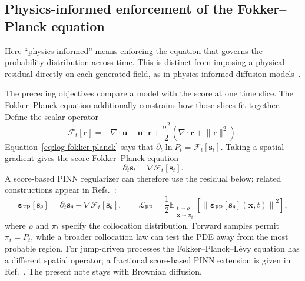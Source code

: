 \documentclass[11pt]{article}
\newcommand{\vct}[1]{\bm{#1}}
\begin{document}
\subsection{Physics-informed enforcement of the Fokker--Planck equation}

Here ``physics-informed'' means enforcing the equation that governs the
probability distribution across time. This is distinct from imposing a physical
residual directly on each generated field, as in physics-informed diffusion
models~\cite{bastek2025physics}.

The preceding objectives compare a model with the score at one time slice.
The Fokker--Planck equation additionally constrains how those slices fit
together. Define the scalar operator
\begin{equation}
    \mathcal{F}_t[\vct{r}]
    =-\nabla\cdot\vct{u}-\vct{u}\cdot\vct{r}
     +\frac{\sigma^2}{2}
      \left(\nabla\cdot\vct{r}+\lVert\vct{r}\rVert^2\right).
    \label{eq:log-fp-operator}
\end{equation}
Equation~\eqref{eq:log-fokker-planck} says that
\(\partial_t\ln P_t=\mathcal{F}_t[\vct{s}_t]\). Taking a spatial gradient
gives the score Fokker--Planck equation
\begin{equation}
    \partial_t\vct{s}_t
    =\nabla\mathcal{F}_t[\vct{s}_t].
    \label{eq:score-fokker-planck}
\end{equation}
A score-based PINN regularizer can therefore use the residual below; related
constructions appear in Refs.~\cite{lai2023,hu2024scorebased}:
\begin{equation}
    \vct{\varepsilon}_{\mathrm{FP}}[\vct{s}_{\theta}]
    =\partial_t\vct{s}_{\theta}
     -\nabla\mathcal{F}_t[\vct{s}_{\theta}],
    \qquad
    \mathcal{L}_{\mathrm{FP}}
    =\frac{1}{2}\mathbb{E}_{\substack{t\sim\rho\\
                          \vct{x}\sim\pi_t}}
      \!\left[\left\lVert
      \vct{\varepsilon}_{\mathrm{FP}}[\vct{s}_{\theta}](\vct{x},t)
      \right\rVert^2\right],
    \label{eq:score-fp-pinn-loss}
\end{equation}
where \(\rho\) and \(\pi_t\) specify the collocation distribution. Forward
samples permit \(\pi_t=P_t\), while a broader collocation law can test the PDE
away from the most probable region.
For jump-driven processes the Fokker--Planck--Lévy equation has a different
spatial operator; a fractional score-based PINN extension is given in
Ref.~\cite{hu2024score}. The present note stays with Brownian diffusion.
\end{document}
